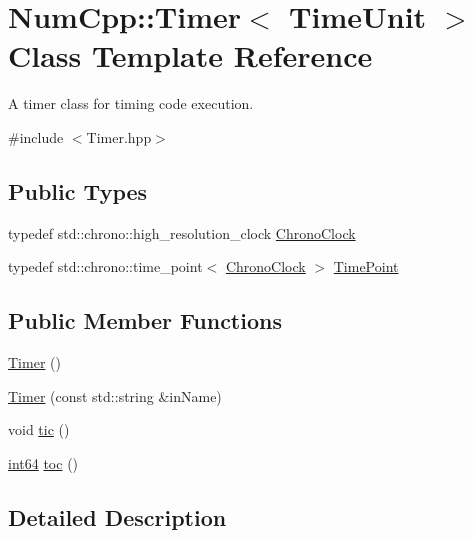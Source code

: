 \hypertarget{class_num_cpp_1_1_timer}{}\section{Num\+Cpp\+:\+:Timer$<$ Time\+Unit $>$ Class Template Reference}
\label{class_num_cpp_1_1_timer}


A timer class for timing code execution.  




{\ttfamily \#include $<$Timer.\+hpp$>$}

\subsection*{Public Types}
\begin{DoxyCompactItemize}
\item 
typedef std\+::chrono\+::high\+\_\+resolution\+\_\+clock \mbox{\hyperlink{class_num_cpp_1_1_timer_aa3bbbc8ee01812af652336ea2b7a1fe2}{Chrono\+Clock}}
\item 
typedef std\+::chrono\+::time\+\_\+point$<$ \mbox{\hyperlink{class_num_cpp_1_1_timer_aa3bbbc8ee01812af652336ea2b7a1fe2}{Chrono\+Clock}} $>$ \mbox{\hyperlink{class_num_cpp_1_1_timer_a8539a1471597c9cc517a5043c425bbf5}{Time\+Point}}
\end{DoxyCompactItemize}
\subsection*{Public Member Functions}
\begin{DoxyCompactItemize}
\item 
\mbox{\hyperlink{class_num_cpp_1_1_timer_a87d3101750d6d321b01bfbbaaae6c1b6}{Timer}} ()
\item 
\mbox{\hyperlink{class_num_cpp_1_1_timer_a36945c44c530ddd72ae0264909dff7d9}{Timer}} (const std\+::string \&in\+Name)
\item 
void \mbox{\hyperlink{class_num_cpp_1_1_timer_a03288816968f855e4e755f35f1f82f85}{tic}} ()
\item 
\mbox{\hyperlink{namespace_num_cpp_a22e530c7304044b86c04203429f3dcd1}{int64}} \mbox{\hyperlink{class_num_cpp_1_1_timer_a73fdacd0e0dde0812d9c2dac05b7f051}{toc}} ()
\end{DoxyCompactItemize}


\subsection{Detailed Description}
